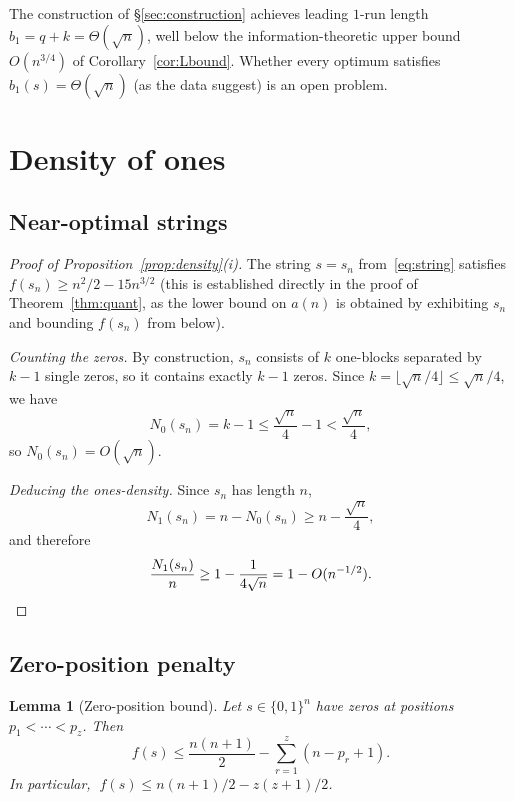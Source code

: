 ﻿\documentclass[11pt,a4paper]{article}
\theoremstyle{plain}
\newtheorem{lemma}[theorem]{Lemma}
\theoremstyle{definition}
\theoremstyle{remark}
\newcommand{\ones}{N_1}
\newcommand{\zeros}{N_0}
\begin{document}
The construction of \S\ref{sec:construction} achieves leading
$1$-run length $b_1=q+k=\Theta(\sqrt n)$, well below the
information-theoretic upper bound $O(n^{3/4})$ of
Corollary~\ref{cor:Lbound}.  Whether every optimum satisfies
$b_1(s)=\Theta(\sqrt n)$ (as the data suggest) is an open problem.

\section{Density of ones}\label{sec:density}

\subsection{Near-optimal strings}

\begin{proof}[Proof of Proposition~\ref{prop:density}(i)]
The string $s=s_n$ from~\eqref{eq:string} satisfies
$f(s_n)\ge n^2/2-15n^{3/2}$ (this is established directly in the proof
of Theorem~\ref{thm:quant}, as the lower bound on $a(n)$ is obtained by
exhibiting $s_n$ and bounding $f(s_n)$ from below).

\textit{Counting the zeros.}
By construction, $s_n$ consists of $k$ one-blocks separated by $k-1$
single zeros, so it contains exactly $k-1$ zeros.  Since
$k=\lfloor\sqrt{n}/4\rfloor\le\sqrt{n}/4$, we have
\[
  \zeros(s_n) = k-1 \le \frac{\sqrt{n}}{4}-1 < \frac{\sqrt{n}}{4},
\]
so $\zeros(s_n)=O(\sqrt{n})$.

\textit{Deducing the ones-density.}
Since $s_n$ has length $n$,
\[
  \ones(s_n) = n - \zeros(s_n) \ge n - \frac{\sqrt{n}}{4},
\]
and therefore
\[
  \frac{\ones(s_n)}{n} \ge 1 - \frac{1}{4\sqrt{n}} = 1 - O(n^{-1/2}).\qedhere
\]
\end{proof}

\subsection{Zero-position penalty}

\begin{lemma}[Zero-position bound]\label{lem:zero-pos}
Let $s\in\{0,1\}^n$ have zeros at positions $p_1<\cdots<p_z$.  Then
\[
  f(s)\le\frac{n(n+1)}{2}-\sum_{r=1}^z(n-p_r+1).
\]
In particular, $\;f(s)\le n(n+1)/2-z(z+1)/2$.
\end{lemma}
\end{document}
